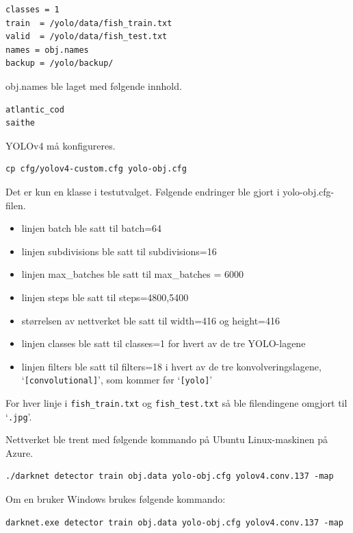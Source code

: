 \begin{lstlisting}[language={}, caption=obj.data]
classes = 1
train  = /yolo/data/fish_train.txt
valid  = /yolo/data/fish_test.txt
names = obj.names
backup = /yolo/backup/
\end{lstlisting}

obj.names ble laget med følgende innhold.

\begin{lstlisting}[language={}, caption=obj.names]
atlantic_cod
saithe
\end{lstlisting}

YOLOv4 må konfigureres.

\begin{verbatim}
cp cfg/yolov4-custom.cfg yolo-obj.cfg
\end{verbatim}

Det er kun en klasse i testutvalget. Følgende endringer ble gjort i yolo-obj.cfg-filen.

\begin{itemize}
  \item linjen batch ble satt til batch=64
  \item linjen subdivisions ble satt til subdivisions=16
  \item linjen max\_batches ble satt til max\_batches = 6000
  \item linjen steps ble satt til steps=4800,5400
  \item størrelsen av nettverket ble satt til width=416 og height=416
  \item linjen classes ble satt til classes=1 for hvert av de tre YOLO-lagene
  \item linjen filters ble satt til filters=18 i hvert av de tre konvolveringslagene, `\texttt{[convolutional]}', som kommer før `\texttt{[yolo]}'
\end{itemize}

For hver linje i \texttt{fish\_train.txt} og \texttt{fish\_test.txt} så ble filendingene omgjort til `\texttt{.jpg}'.

Nettverket ble trent med følgende kommando på Ubuntu Linux-maskinen på Azure.

\begin{verbatim}
./darknet detector train obj.data yolo-obj.cfg yolov4.conv.137 -map
\end{verbatim}

Om en bruker Windows brukes følgende kommando:

\begin{verbatim}
darknet.exe detector train obj.data yolo-obj.cfg yolov4.conv.137 -map
\end{verbatim}

